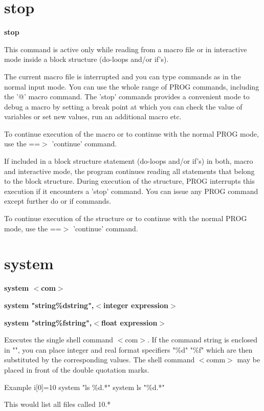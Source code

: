 \section{stop}
{\bf stop \par }
\par
\vspace{3pt}
This command is active only while reading from a macro file or in 
interactive mode inside a block structure (do-loops and/or if's). 
\par
The current macro file is interrupted and you can type commands as in the 
normal input mode. You can use the whole range of PROG commands, 
including the '@' macro command. The 'stop' commands provides a convenient 
mode to debug a macro by setting a break point at which you can check the 
value of variables or set new values, run an additional macro etc. 
\par
To continue execution of the macro or to continue with the normal 
PROG mode, use the ==$> $ 'continue' command. 
\par
If included in a block structure statement (do-loops and/or if's) in 
both, macro and interactive mode, the program continues reading all 
statements that belong to the block structure. During execution of the 
structure, PROG interrupts this execution if it encounters a 'stop' 
command. You can issue any PROG command except further do or if commands. 
\par
To continue execution of the structure or to continue with the normal 
PROG mode, use the ==$> $ 'continue' command. 
\section{system}
{\bf system $ <$com$> $ \par }
{\bf system "string\%dstring",$ <$integer expression$> $ \par }
{\bf system "string\%fstring",$ <$float expression$> $ \par }
\par
\vspace{3pt}
Executes the single shell command $ <$com$> $. 
If the command string is enclosed in "", you can place integer and 
real format specifiers "\%d" "\%f" which are then substituted by the 
corresponding values. 
The shell command $ <$comm$> $ may be placed in front of the double 
quotation marks. 
\par
Example 
i[0]=10 
system "ls \%d.*" 
system ls "\%d.*" 
\par
This would list all files called 10.* 
